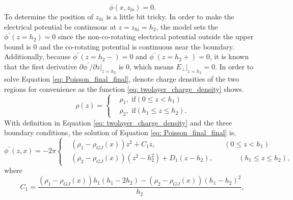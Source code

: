 \documentclass[a4paper, 12pt]{report}
\begin{document}
    \begin{equation}
      \label{eq: lower_boundary}
      \phi \left(x, z_{lo}\right) = 0 .
    \end{equation}
    To determine the position of $z_{hi}$ is a little bit tricky. In order to make the electrical 
    potential be continuous at $z = z_{hi} = h_2$, the model sets the 
    $\phi^{\prime}\left(z=h_{2}\right) = 0$ since the non-co-rotating electrical potential 
    outside the upper bound is $0$ and the co-rotating potential is continuous near the 
    boundary. Additionally, because $\phi^{\prime}\left(z=h_{2}-\right) = 0$
    and $\phi^{\prime}\left(z=h_{2}+\right) = 0$, it is known that the first derivative 
    $\partial{\phi^{\prime}}/\partial{z}\vert_{z=h_{2}}$ is $0$, which means 
    $E_{\perp}\vert_{z=h_{2}} = 0$. In order to solve Equation \ref{eq: Poisson_final_final}, 
    denote charge densities of the two regions for convenience as the function 
    \ref{eq: twolayer_charge_density} shows.
    \begin{equation}
      \label{eq: twolayer_charge_density}
        \rho\left(z\right) = 
        \begin{cases}
          & \rho_{1} , \text{    if} \left(0 \leq z < h_{1}\right)\\
          & \rho_{2} , \text{    if} \left(h_{1} \leq z \leq h_{2}\right) .
        \end{cases}       
    \end{equation}
    With definition in Equation \ref{eq: twolayer_charge_density} and the three boundary 
    conditions, the solution of Equation \ref{eq: Poisson_final_final} is, 
    \begin{equation}
      \label{eq: twolayer_potential}
        \phi^{\prime}\left(z, x\right) = -2\pi
        \left\{\begin{alignedat}{2}
          & \left(\rho_{1} - \rho_{GJ}\left(x\right)\right)z^2 + C_{1} z ,  &&\left(0 \leq z < h_{1}\right)\\
          & \left(\rho_{2}-\rho_{GJ}\left(x\right)\right)\left(z^2 - h_2^2\right) + D_{1} \left(z-h_2\right),  &&\qquad \left(h_{1} \leq z \leq h_{2}\right) ,
        \end{alignedat}\right.
    \end{equation}
    where 
    \begin{equation*}
      C_{1} = \frac{\left(\rho_{1}-\rho_{GJ}\left(x\right)\right)h_1\left(h_1-2h_2\right)-\left(\rho_2-\rho_{GJ}\left(x\right)\right)\left(h_1-h_2\right)^2}{h_2} ,
    \end{equation*}
\end{document}
